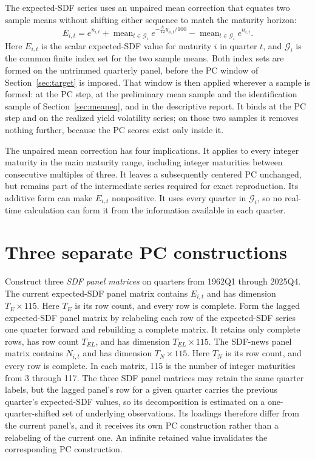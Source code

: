 \documentclass[11pt]{article}
\begin{document}
The expected-SDF series uses an unpaired mean correction that equates two sample means without
shifting either sequence to match the maturity horizon:
\begin{equation*}
 E_{i,t}=e^{n_{i,t}}+
 \operatorname{mean}_{t\in\mathcal G_i}
       e^{-\frac{h}{12}y_{h,t}/100}
       -\operatorname{mean}_{t\in\mathcal G_i}e^{n_{i,t}}.
\end{equation*}
Here \(E_{i,t}\) is the scalar expected-SDF value for maturity \(i\) in quarter \(t\), and
\(\mathcal G_i\) is the common finite index set for the two sample means. Both index sets are formed
on the untrimmed quarterly panel, before the PC window of Section~\ref{sec:target} is
imposed. That window is then applied wherever a sample is formed: at the PC step, at the preliminary
mean sample and the identification sample of Section~\ref{sec:meaneq}, and in the descriptive report.
It binds at the PC step and on the realized yield volatility series;
on those two samples it removes nothing further, because the PC scores exist only inside it.

The unpaired mean correction has four implications. It applies to every integer maturity in the main
maturity range, including integer maturities between consecutive multiples of three. It leaves a subsequently
centered PC unchanged, but remains part of the intermediate series required for exact reproduction. Its
additive form can make \(E_{i,t}\) nonpositive. It uses every quarter in \(\mathcal G_i\), so no real-time calculation can form it from the
information available in each quarter.

\section{Three separate PC constructions}
\label{sec:pca}

Construct three \emph{SDF panel matrices} on quarters from 1962Q1 through 2025Q4. The current
expected-SDF panel matrix contains \(E_{i,t}\) and has dimension \(T_E\times115\). Here \(T_E\)
is its row count, and every row is complete. Form the lagged expected-SDF panel matrix by relabeling each row
of the expected-SDF series one quarter forward and rebuilding a complete matrix. It retains
only complete rows, has row count \(T_{EL}\), and has dimension \(T_{EL}\times115\). The SDF-news panel matrix contains
\(N_{i,t}\) and has dimension \(T_N\times115\). Here \(T_N\) is its row count, and every row is complete. In
each matrix, 115 is the number of integer maturities from 3 through 117. The three SDF panel matrices
may retain the same quarter labels, but the lagged panel's row for a given quarter carries the
previous quarter's expected-SDF values, so its decomposition is estimated on a one-quarter-shifted
set of underlying observations. Its loadings therefore differ from the current panel's, and it
receives its own PC construction rather than a relabeling of the current one. An infinite
retained value invalidates the corresponding PC construction.
\end{document}
